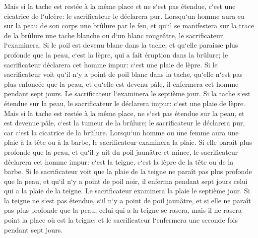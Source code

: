 \verse Mais si la tache est restée à la même place et ne s`est pas étendue, c`est une cicatrice de l`ulcère: le sacrificateur le déclarera pur. 
\verse Lorsqu`un homme aura eu sur la peau de son corps une brûlure par le feu, et qu`il se manifestera sur la trace de la brûlure une tache blanche ou d`un blanc rougeâtre, le sacrificateur l`examinera. 
\verse Si le poil est devenu blanc dans la tache, et qu`elle paraisse plus profonde que la peau, c`est la lèpre, qui a fait éruption dans la brûlure; le sacrificateur déclarera cet homme impur: c`est une plaie de lèpre. 
\verse Si le sacrificateur voit qu`il n`y a point de poil blanc dans la tache, qu`elle n`est pas plus enfoncée que la peau, et qu`elle est devenu pâle, il enfermera cet homme pendant sept jours. 
\verse Le sacrificateur l`examinera le septième jour. Si la tache s`est étendue sur la peau, le sacrificateur le déclarera impur: c`est une plaie de lèpre. 
\verse Mais si la tache est restée à la même place, ne s`est pas étendue sur la peau, et est devenue pâle, c`est la tumeur de la brûlure; le sacrificateur le déclarera pur, car c`est la cicatrice de la brûlure. 
\verse Lorsqu`un homme ou une femme aura une plaie à la tête ou à la barbe, 
\verse le sacrificateur examinera la plaie. Si elle paraît plus profonde que la peau, et qu`il y ait du poil jaunâtre et mince, le sacrificateur déclarera cet homme impur: c`est la teigne, c`est la lèpre de la tête ou de la barbe. 
\verse Si le sacrificateur voit que la plaie de la teigne ne paraît pas plus profonde que la peau, et qu`il n`y a point de poil noir, il enferma pendant sept jours celui qui a la plaie de la teigne. 
\verse Le sacrificateur examinera la plaie le septième jour. Si la teigne ne s`est pas étendue, s`il n`y a point de poil jaunâtre, et si elle ne paraît pas plus profonde que la peau, 
\verse celui qui a la teigne se rasera, mais il ne rasera point la place où est la teigne; et le sacrificateur l`enfermera une seconde fois pendant sept jours. 
